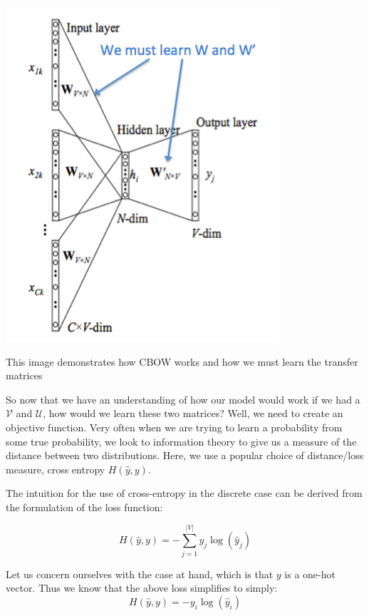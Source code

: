 \documentclass[nobib]{tufte-handout}
\begin{document}
\begin{marginfigure}%
  \includegraphics[width=\linewidth]{CBOW}
  \caption{This image demonstrates how CBOW works and how we must learn the transfer matrices}
  \label{fig:CBOW}
\end{marginfigure}

So now that we have an understanding of how our model would work if we had a $\mathcal{V}$ and $\mathcal{U}$, how would we learn these two matrices? Well, we need to create an objective function. Very often when we are trying to learn a probability from some true probability, we look to information theory to give us a measure of the distance between two distributions. Here, we use a popular choice of distance/loss measure, cross entropy $H(\hat{y},y)$. 

The intuition for the use of cross-entropy in the discrete case can be derived from the formulation of the loss function:

$$H(\hat{y},y) = -\sum_{j = 1}^{|V|} y_j \log(\hat{y}_j)$$

Let us concern ourselves with the case at hand, which is that $y$ is a one-hot vector. Thus we know that the above loss simplifies to simply:
$$H(\hat{y},y) = -y_i \log(\hat{y}_i)$$
\end{document}
